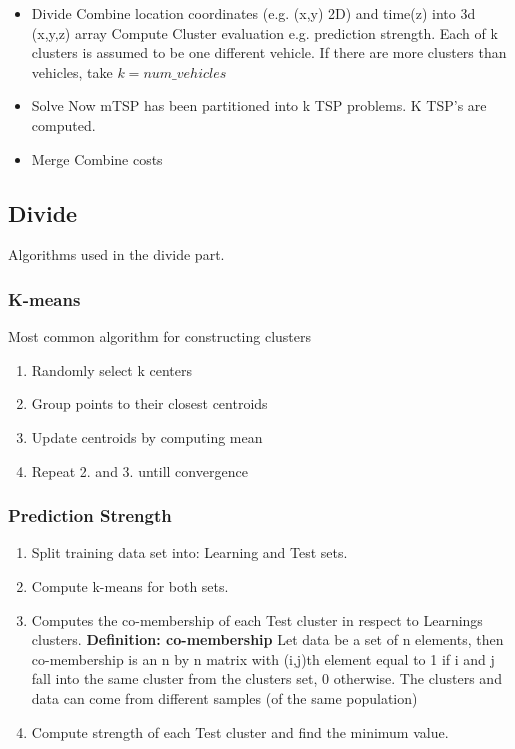 \documentclass{article}
\begin{document}
\begin{itemize}
	\item Divide 
	Combine location coordinates (e.g. (x,y) 2D) and time(z) into 3d (x,y,z) array
	Compute Cluster evaluation e.g. prediction strength.
	Each of k clusters is assumed to be one different vehicle. 
	If there are more clusters than vehicles, take $k = num\_vehicles$
	
	\item Solve
	Now mTSP has been partitioned into k TSP problems.
	K TSP's are computed.
	
	\item Merge
	Combine costs
\end{itemize}

\subsection{Divide}        
Algorithms used in the divide part.

	\subsubsection{K-means}
	Most common algorithm for constructing clusters

	\begin{enumerate}
		\item Randomly select k centers
		\item Group points to their closest centroids
		\item Update centroids by computing mean
		\item Repeat 2. and 3. untill convergence
	\end{enumerate}
	
	\subsubsection{Prediction Strength}


	\begin{enumerate}
		\item Split training data set into: Learning and Test sets.
		
		\item Compute k-means for both sets.
		
		\item Computes the co-membership of 
		each Test cluster in respect to Learnings clusters.
			{\bf Definition: co-membership}
			Let data be a set of n elements, then co-membership 
			is an n by n matrix with (i,j)th element equal to 1
			if i and j fall into the same cluster from the clusters set, 0 otherwise.
			The clusters and data can come from different samples (of the same population) 
			
		\item Compute strength of each Test cluster and find the minimum value.
	\end{enumerate}	
\end{document}
